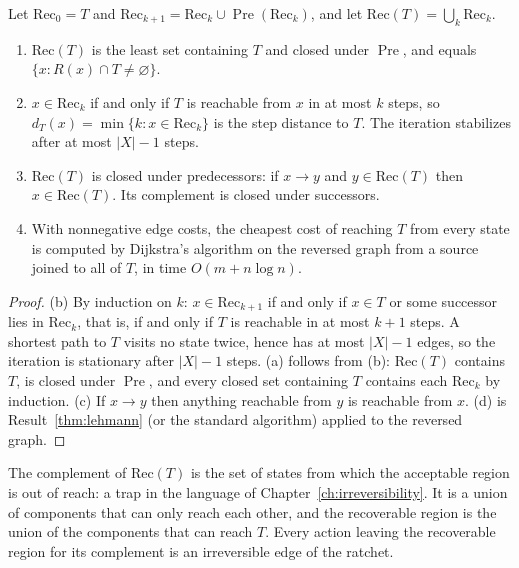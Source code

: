 \begin{newresult}\label{thm:recoverable}
Let $\mathrm{Rec}_0=T$ and $\mathrm{Rec}_{k+1}=\mathrm{Rec}_k\cup\operatorname{Pre}(\mathrm{Rec}_k)$, and let $\mathrm{Rec}(T)=\bigcup_k\mathrm{Rec}_k$.
\begin{enumerate}[nosep,label=(\alph*)]
  \item $\mathrm{Rec}(T)$ is the least set containing $T$ and closed under $\operatorname{Pre}$, and equals $\{x:R(x)\cap T\ne\varnothing\}$.
  \item $x\in\mathrm{Rec}_k$ if and only if $T$ is reachable from $x$ in at most $k$ steps, so $d_T(x)=\min\{k:x\in\mathrm{Rec}_k\}$ is the step distance to $T$. The iteration stabilizes after at most $|X|-1$ steps.
  \item $\mathrm{Rec}(T)$ is closed under predecessors: if $x\to y$ and $y\in\mathrm{Rec}(T)$ then $x\in\mathrm{Rec}(T)$. Its complement is closed under successors.
  \item With nonnegative edge costs, the cheapest cost of reaching $T$ from every state is computed by Dijkstra's algorithm on the reversed graph from a source joined to all of $T$, in time $O(m+n\log n)$.
\end{enumerate}
\end{newresult}
\begin{proof}
(b) By induction on $k$: $x\in\mathrm{Rec}_{k+1}$ if and only if $x\in T$ or some successor lies in $\mathrm{Rec}_k$, that is, if and only if $T$ is reachable in at most $k+1$ steps. A shortest path to $T$ visits no state twice, hence has at most $|X|-1$ edges, so the iteration is stationary after $|X|-1$ steps. (a) follows from (b): $\mathrm{Rec}(T)$ contains $T$, is closed under $\operatorname{Pre}$, and every closed set containing $T$ contains each $\mathrm{Rec}_k$ by induction. (c) If $x\to y$ then anything reachable from $y$ is reachable from $x$. (d) is Result~\ref{thm:lehmann} (or the standard algorithm) applied to the reversed graph.
\end{proof}

The complement of $\mathrm{Rec}(T)$ is the set of states from which the acceptable region is out of reach: a trap in the language of Chapter~\ref{ch:irreversibility}. It is a union of components that can only reach each other, and the recoverable region is the union of the components that can reach $T$. Every action leaving the recoverable region for its complement is an irreversible edge of the ratchet.

